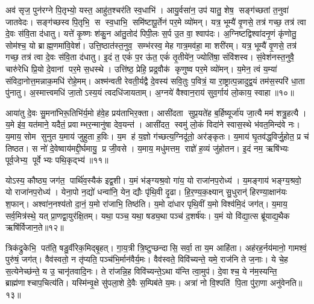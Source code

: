 अव॑ सृज॒ पुन॑रग्ने पि॒तृभ्यो॒ यस्त॒ आहु॑त॒श्चर॑ति स्व॒धाभि॑। आयु॒र्वसा॑न॒ उप॑ यातु॒ शेष॒ सङ्ग॑च्छतां त॒नुवा॑ जातवेदः। सङ्ग॑च्छस्व पि॒तृभि॒ स स्व॒धाभि॒ समि॑ष्टापू॒र्तेन॑ पर॒मे व्यो॑मन्। यत्र॒ भूम्यै॑ वृ॒णसे॒ तत्र॑ गच्छ॒ तत्र॑ त्वा दे॒वः स॑वि॒ता द॑धातु। यत्ते॑ कृ॒ष्णः  श॑कु॒न आ॑तु॒तोद॑ पिपी॒लः स॒र्प उ॒त वा॒ श्वाप॑दः। अ॒ग्निष्टद्विश्वा॑दनृ॒णं कृ॑णोतु॒ सोम॑श्च॒ यो ब्राह्म॒णमा॑वि॒वेश॑। उत्ति॒ष्ठात॑स्त॒नुव॒ सम्भ॑रस्व॒ मेह गात्र॒मव॑हा॒ मा शरी॑रम्। यत्र॒ भूम्यै॑ वृ॒णसे॒ तत्र॑ गच्छ॒ तत्र॑ त्वा दे॒वः स॑वि॒ता द॑धातु। इ॒दं त॒ एकं॑ प॒र ऊ॑त॒ एकं॑ तृ॒तीये॑न॒ ज्योति॑षा॒ संवि॑शस्व। सं॒वेश॑नस्त॒नुवै॒ चारु॑रेधि प्रि॒यो दे॒वानां पर॒मे स॒धस्थे। उत्ति॑ष्ठ॒ प्रेहि॒ प्रद्र॒वौक॑ कृणुष्व पर॒मे व्यो॑मन्। य॒मेन॒ त्वं य॒म्या॑ संविदा॒नोत्त॒मन्नाक॒मधि॑ रोहे॒मम्। अश्म॑न्वती रेवती॒र्यद्वै दे॒वस्य॑ सवि॒तुः प॒वित्रं॒ या रा॒ष्ट्रात्प॒न्नादुद्व॒यं तम॑स॒स्परि॑ धा॒ता पु॑नातु। अ॒स्मात्त्वमधि॑ जा॒तोऽस्य॒यं त्वदधि॑जायताम्। अ॒ग्नये॑ वैश्वान॒राय॑ सुव॒र्गाय॑ लो॒काय॒ स्वाहा॥१०॥
\anuvakamend[अव॑शीयता स॒धस्थे॒ पञ्च॑ च]

आया॑तु दे॒वः सु॒मना॑भिरू॒तिभि॑र्य॒मो ह॑वे॒ह प्रय॑ताभिर॒क्ता। आसी॑दता सुप्र॒यते॑ह ब॒र्\mbox{}हिष्यूर्जा॑य जा॒त्यै मम॑ शत्रु॒हत्यै। य॒मे इ॑व॒ यत॑माने॒ यदैतं॒ प्रवाम्भर॒न्मानु॑षा देव॒यन्त॑। आसी॑दत॒ स्वमु॑ लो॒कं  विदा॑ने स्वास॒स्थे भ॑वत॒मिन्द॑वे नः। य॒माय॒ सोम सुनुत य॒माय॑ जुहुता ह॒विः। य॒म ह॑ य॒ज्ञो ग॑च्छत्य॒ग्निदू॑तो॒ अर॑ङ्कृतः। य॒माय॑ घृ॒तव॑द्ध॒विर्जु॒होत॒ प्र च॑ तिष्ठत। स नो॑ दे॒वेष्वाय॑मद्दी॒र्घमायु॒ प्र जी॒वसे। य॒माय॒ मधु॑मत्तम॒ राज्ञे॑ ह॒व्यं जु॑होतन। इ॒दं नम॒ ऋषि॑भ्यः पूर्व॒जेभ्य॒ पूर्वेभ्यः पथि॒कृद्भ्य॑॥११॥

योऽस्य॒ कौष्ठ्य॒ जग॑त॒ पार्थि॑व॒स्यैक॑ इद्व॒शी। य॒मं भ॑ङ्ग्यश्र॒वो गा॑य॒ यो राजा॑नप॒रोध्य॑। य॒मङ्गाय॑ भङ्ग्य॒श्रवो॒ यो राजा॑नप॒रोध्य॑। येना॒पो न॒द्यो॑ धन्वा॑नि॒ येन॒ द्यौः पृ॑थि॒वी दृ॒ढा। हि॒र॒ण्य॒क॒क्ष्यान् सु॒धुरान्॑ हिरण्या॒क्षान॑यः  श॒फान्। अश्वा॑न॒नश्य॑तो दा॒नं॒ य॒मो रा॑जाभि॒ तिष्ठ॑ति। य॒मो दा॑धार पृथि॒वीं य॒मो विश्व॑मि॒दं जग॑त्। य॒माय॒ सर्व॒मित्र॑स्थे॒ यत् प्रा॒णद्वा॒युर॑क्षि॒तम्। यथा॒ पञ्च॒ यथा॒ षड्य॒था पञ्च॑ द॒शर्\mbox{}ष॑यः। य॒मं यो वि॑द्या॒त्स ब्रू॑याद्य॒थैक ऋषि॑र्विजान॒ते॥१२॥

त्रिक॑द्रुकेभि॒ पत॑ति॒ षडु॒र्वीरेक॒मिद्बृ॒हत्। गा॒य॒त्री त्रि॒ष्टुप्छन्दासि॒ सर्वा॒ ता य॒म आहि॑ता। अह॑रह॒र्नय॑मानो॒ गामश्वं॒ पुरु॑षं॒ जग॑त्। वैव॑स्वतो॒ न तृ॑प्यति॒ पञ्च॑भि॒र्मान॑वैर्य॒मः। वैव॑स्वते॒ विवि॑च्यन्ते॒ यमे॒ राज॑नि ते ज॒नाः। ये चे॒ह स॒त्येनेच्छ॑न्ते॒ य उ॒ चानृ॑तवादि॒नः। ते रा॑जन्नि॒ह विवि॑च्यन्ते॒ऽथा य॑न्ति त्वा॒मुप॑। दे॒वाश्च॒ ये न॑म॒स्यन्ति॒ ब्राह्म॑णाश्चाप॒चित्य॑ति। यस्मि॑न्वृ॒क्षे सु॑पला॒शे दे॒वैः स॒म्पिब॑ते य॒मः। अत्रा॑ नो वि॒श्पति॑ पि॒ता पु॑रा॒णा अनु॑वेनति॥१३॥
\anuvakamend[प॒थि॒कृद्भ्यो॑ विजान॒तेऽनु॑ वेनति]

